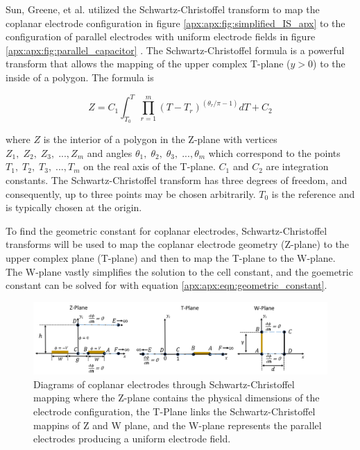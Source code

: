  
    \par Sun, Greene, et al. utilized the Schwartz-Christoffel transform to map the coplanar electrode configuration in figure \ref{apx:apx:fig:simplified_IS_apx} to the configuration of parallel electrodes with uniform electrode fields in figure \ref{apx:apx:fig:parallel_capacitor} \cite{sun_analytical_2007}. The Schwartz-Christoffel formula is a powerful transform that allows the mapping of the upper complex T-plane ($y>0$) to the inside of a polygon. The formula is
    
    \begin{equation}
        Z = C_1 \int_{T_0}^T \prod^m_{r=1} (T - T_r)^{(\theta_r/\pi - 1)} dT + C_2
    \end{equation}
    
    \noindent where $Z$ is the interior of a polygon in the Z-plane with vertices $Z_1,\;Z_2,\;Z_3,\; ...,Z_m$ and angles $\theta_1,\;\theta_2,\;\theta_3,\; ...,\theta_m$ which correspond to the points $T_1,\;T_2,\;T_3,\; ...,T_m$ on the real axis of the T-plane. $C_1$ and $C_2$ are integration constants. The Schwartz-Christoffel transform has three degrees of freedom, and consequently, up to three points may be chosen arbitrarily. $T_0$ is the reference and is typically chosen at the origin.
    
    \par To find the geometric constant for coplanar electrodes, Schwartz-Christoffel transforms will be used to map the coplanar electrode geometry (Z-plane) to the upper complex plane (T-plane) and then to map the T-plane to the W-plane. The W-plane vastly simplifies the solution to the cell constant, and the goemetric constant can be solved for with equation \ref{apx:apx:eqn:geometric_constant}. 
    
    \begin{figure}[h]
        \centering
        \includegraphics[width=\textwidth]{images/scmPlanes.png}
        \caption[Diagrams of coplanar electrodes through Schwartz-Christoffel mapping]{Diagrams of coplanar electrodes through Schwartz-Christoffel mapping where the Z-plane contains the physical dimensions of the electrode configuration, the T-Plane links the Schwartz-Christoffel mappins of Z and W plane, and the W-plane represents the parallel electrodes producing a uniform electrode field.}
        \label{apx:apx:fig:scm_planes}
    \end{figure}
    
